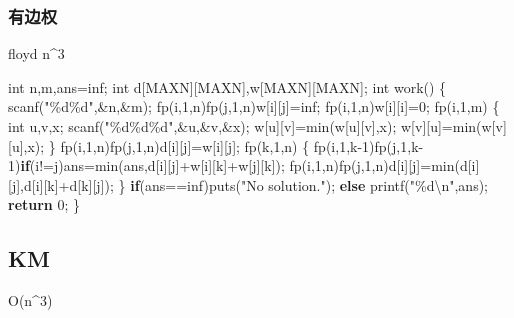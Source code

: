 \documentclass[
]{article}
\newenvironment{Shaded}{}{}
\newcommand{\ControlFlowTok}[1]{\textcolor[rgb]{0.00,0.44,0.13}{\textbf{#1}}}
\newcommand{\DataTypeTok}[1]{\textcolor[rgb]{0.56,0.13,0.00}{#1}}
\newcommand{\DecValTok}[1]{\textcolor[rgb]{0.25,0.63,0.44}{#1}}
\newcommand{\NormalTok}[1]{#1}
\newcommand{\SpecialCharTok}[1]{\textcolor[rgb]{0.25,0.44,0.63}{#1}}
\newcommand{\StringTok}[1]{\textcolor[rgb]{0.25,0.44,0.63}{#1}}
\begin{document}
\hypertarget{ux6709ux8fb9ux6743}{%
\subsubsection{有边权}\label{ux6709ux8fb9ux6743}}

floyd n\^{}3

\begin{Shaded}
\begin{Highlighting}[]
\DataTypeTok{int}\NormalTok{ n,m,ans=inf;}
\DataTypeTok{int}\NormalTok{ d[MAXN][MAXN],w[MAXN][MAXN];}
\DataTypeTok{int}\NormalTok{ work()}
\NormalTok{\{}
\NormalTok{    scanf(}\StringTok{"}\SpecialCharTok{\%d\%d}\StringTok{"}\NormalTok{,\&n,\&m);}
\NormalTok{    fp(i,}\DecValTok{1}\NormalTok{,n)fp(j,}\DecValTok{1}\NormalTok{,n)w[i][j]=inf;}
\NormalTok{    fp(i,}\DecValTok{1}\NormalTok{,n)w[i][i]=}\DecValTok{0}\NormalTok{;}
\NormalTok{    fp(i,}\DecValTok{1}\NormalTok{,m)}
\NormalTok{    \{}
        \DataTypeTok{int}\NormalTok{ u,v,x;}
\NormalTok{        scanf(}\StringTok{"}\SpecialCharTok{\%d\%d\%d}\StringTok{"}\NormalTok{,\&u,\&v,\&x);}
\NormalTok{        w[u][v]=min(w[u][v],x);}
\NormalTok{        w[v][u]=min(w[v][u],x);}
\NormalTok{    \}}
\NormalTok{    fp(i,}\DecValTok{1}\NormalTok{,n)fp(j,}\DecValTok{1}\NormalTok{,n)d[i][j]=w[i][j];}
\NormalTok{    fp(k,}\DecValTok{1}\NormalTok{,n)}
\NormalTok{    \{}
\NormalTok{        fp(i,}\DecValTok{1}\NormalTok{,k{-}}\DecValTok{1}\NormalTok{)fp(j,}\DecValTok{1}\NormalTok{,k{-}}\DecValTok{1}\NormalTok{)}\ControlFlowTok{if}\NormalTok{(i!=j)ans=min(ans,d[i][j]+w[i][k]+w[j][k]);}
\NormalTok{        fp(i,}\DecValTok{1}\NormalTok{,n)fp(j,}\DecValTok{1}\NormalTok{,n)d[i][j]=min(d[i][j],d[i][k]+d[k][j]);}
\NormalTok{    \}}
    \ControlFlowTok{if}\NormalTok{(ans==inf)puts(}\StringTok{"No solution."}\NormalTok{);}
    \ControlFlowTok{else}\NormalTok{ printf(}\StringTok{"}\SpecialCharTok{\%d\textbackslash{}n}\StringTok{"}\NormalTok{,ans);}
    \ControlFlowTok{return} \DecValTok{0}\NormalTok{;}
\NormalTok{\}}
\end{Highlighting}
\end{Shaded}

\hypertarget{km}{%
\subsection{KM}\label{km}}

O(n\^{}3)
\end{document}

